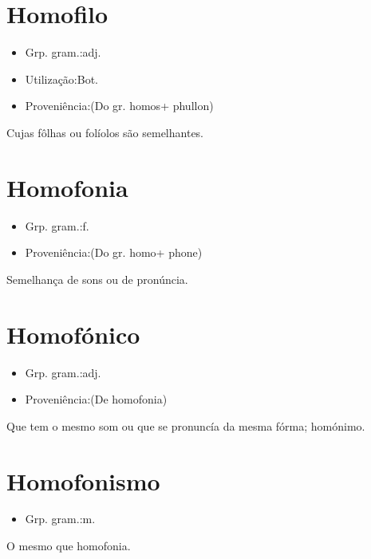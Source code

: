 \documentclass{article}
\begin{document}
\section{Homofilo}
\begin{itemize}
\item {Grp. gram.:adj.}
\end{itemize}
\begin{itemize}
\item {Utilização:Bot.}
\end{itemize}
\begin{itemize}
\item {Proveniência:(Do gr. \textunderscore homos\textunderscore  + \textunderscore phullon\textunderscore )}
\end{itemize}
Cujas fôlhas ou folíolos são semelhantes.
\section{Homofonia}
\begin{itemize}
\item {Grp. gram.:f.}
\end{itemize}
\begin{itemize}
\item {Proveniência:(Do gr. \textunderscore homo\textunderscore  + \textunderscore phone\textunderscore )}
\end{itemize}
Semelhança de sons ou de pronúncia.
\section{Homofónico}
\begin{itemize}
\item {Grp. gram.:adj.}
\end{itemize}
\begin{itemize}
\item {Proveniência:(De \textunderscore homofonia\textunderscore )}
\end{itemize}
Que tem o mesmo som ou que se pronuncía da mesma fórma; homónimo.
\section{Homofonismo}
\begin{itemize}
\item {Grp. gram.:m.}
\end{itemize}
O mesmo que \textunderscore homofonia\textunderscore .
\end{document}
